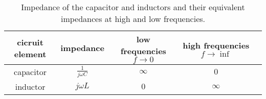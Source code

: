 \documentclass{ximera}
\begin{document}
\begin{table}[htbp]
\centering
\begin{tabular}{|c|c|c|c|c|} \hline
cicruit element & impedance & low frequencies $f \to 0$& high frequencies $f \to \inf$   \\  \hline  
 capacitor     & $\frac{1}{j \omega C}$    & $\infty$ & $0$    \\  \hline       
 inductor & $j \omega L$              &    $0$   &       $\infty $             \\ \hline
\end{tabular}
\caption{Impedance of the capacitor and inductors and their equivalent impedances at high and low frequencies.}
\end{table}
\end{document}
